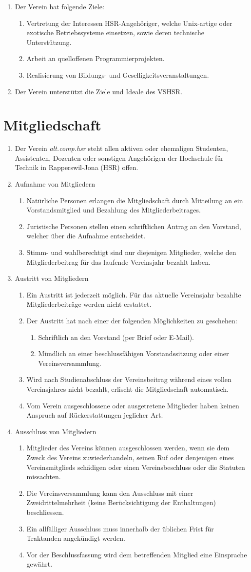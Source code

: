 \documentclass[10pt,a4paper,parskip,fleqn]{scrartcl}
\newcommand{\ol}{\begin{enumerate}[itemsep=-0.2em,topsep=-0.2em]}
\newcommand{\lo}{\end{enumerate}}
\newcommand{\li}{\item}
\begin{document}
\ol
	\li Der Verein hat folgende Ziele:
    \ol
      \li Vertretung der Interessen HSR-Angehöriger, welche Unix-artige oder
      exotische Betriebssysteme einsetzen, sowie deren technische Unterstützung.
      \li Arbeit an quelloffenen Programmierprojekten.
		  \li Realisierung von Bildungs- und Geselligkeitsveranstaltungen.
    \lo
	\li Der Verein unterstützt die Ziele und Ideale des VSHSR. 
\lo


\section{Mitgliedschaft}

\ol
  \li Der Verein \textit{alt.comp.hsr} steht allen aktiven oder ehemaligen
  Studenten, Assistenten, Dozenten oder sonstigen Angehörigen der Hochschule für
  Technik in Rapperswil-Jona (HSR) offen.
	\li Aufnahme von Mitgliedern
		\ol
			\li Natürliche Personen erlangen die Mitgliedschaft durch Mitteilung an
			ein Vorstandsmitglied und Bezahlung des Mitgliederbeitrages.
			\li Juristische Personen stellen einen schriftlichen Antrag an den
			Vorstand, welcher über die Aufnahme entscheidet.
			\li Stimm- und wahlberechtigt sind nur diejenigen Mitglieder, welche den
			Mitgliederbeitrag für das laufende Vereinsjahr bezahlt haben.
		\lo
	\li Austritt von Mitgliedern
		\ol
			\li Ein Austritt ist jederzeit möglich. Für das aktuelle Vereinsjahr
			bezahlte Mitgliederbeiträge werden nicht erstattet.
			\li Der Austritt hat nach einer der folgenden Möglichkeiten zu geschehen:
				\ol
					\li Schriftlich an den Vorstand (per Brief oder E-Mail).
          \li Mündlich an einer beschlussfähigen Vorstandssitzung oder einer
          Vereinsversammlung.
				\lo
      \li Wird nach Studienabschluss der Vereinsbeitrag während eines vollen
      Vereinsjahres nicht bezahlt, erlischt die Mitgliedschaft automatisch.
			\li Vom Verein ausgeschlossene oder ausgetretene Mitglieder haben keinen
			Anspruch auf Rückerstattungen jeglicher Art.
		\lo
	\li{Ausschluss von Mitgliedern}
		\ol
			\li Mitglieder des Vereins können ausgeschlossen werden, wenn sie dem
			Zweck des Vereins zuwiederhandeln, seinen Ruf oder denjenigen eines
			Vereinsmitglieds schädigen oder einen Vereinsbeschluss oder die Statuten
			missachten.
			\li Die Vereinsversammlung kann den Ausschluss mit einer
			Zweidrittelmehrheit (keine Berücksichtigung der Enthaltungen)
			beschliessen.
			\li Ein allfälliger Ausschluss muss innerhalb der üblichen Frist für
			Traktanden angekündigt werden.
			\li Vor der Beschlussfassung wird dem betreffenden Mitglied eine
			Einsprache gewährt.
		\lo
\lo
\end{document}
